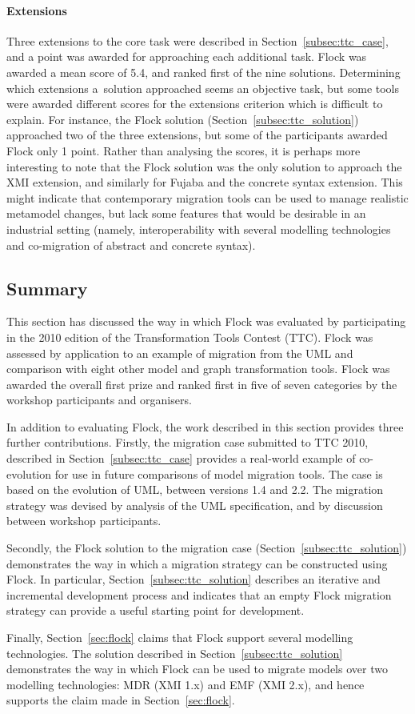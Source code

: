 \paragraph{Extensions} Three extensions to the core task were described in Section~\ref{subsec:ttc_case}, and a point was awarded for approaching each additional task. Flock was awarded a mean score of 5.4, and ranked first of the nine solutions. Determining which extensions a solution approached seems an objective task, but some tools were awarded different scores for the extensions criterion which is difficult to explain. For instance, the Flock solution (Section~\ref{subsec:ttc_solution}) approached two of the three extensions, but some of the participants awarded Flock only 1 point. Rather than analysing the scores, it is perhaps more interesting to note that the Flock solution was the only solution to approach the XMI extension, and similarly for Fujaba \cite{fujaba} and the concrete syntax extension. This might indicate that contemporary migration tools can be used to manage realistic metamodel changes, but lack some features that would be desirable in an industrial setting (namely, interoperability with several modelling technologies and co-migration of abstract and concrete syntax).

\subsection{Summary}
This section has discussed the way in which Flock was evaluated by participating in the 2010 edition of the Transformation Tools Contest (TTC). Flock was assessed by application to an example of migration from the UML and comparison with eight other model and graph transformation tools. Flock was awarded the overall first prize and ranked first in five of seven categories by the workshop participants and organisers. 

In addition to evaluating Flock, the work described in this section provides three further contributions. Firstly, the migration case submitted to TTC 2010, described in Section~\ref{subsec:ttc_case} provides a real-world example of co-evolution for use in future comparisons of model migration tools. The case is based on the evolution of UML, between versions 1.4 and 2.2. The migration strategy was devised by analysis of the UML specification, and by discussion between workshop participants.


Secondly, the Flock solution to the migration case (Section~\ref{subsec:ttc_solution}) demonstrates the way in which a migration strategy can be constructed using Flock. In particular, Section~\ref{subsec:ttc_solution} describes an iterative and incremental development process and indicates that an empty Flock migration strategy can provide a useful starting point for development.

Finally, Section~\ref{sec:flock} claims that Flock support several modelling technologies. The solution described in Section~\ref{subsec:ttc_solution} demonstrates the way in which Flock can be used to migrate models over two modelling technologies: MDR (XMI 1.x) and EMF (XMI 2.x), and hence supports the claim made in Section~\ref{sec:flock}.